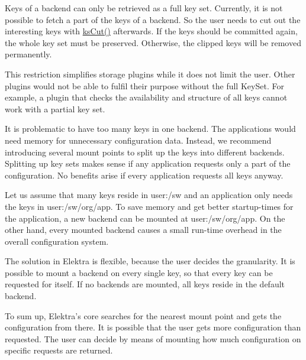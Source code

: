 \label{doc_help_elektra-granularity_md_md_doc_help_elektra_granularity}%
%
 Keys of a backend can only be retrieved as a full key set. Currently, it is not possible to fetch a part of the keys of a backend. So the user needs to cut out the interesting keys with {\ttfamily \mbox{\hyperlink{group__keyset_ga6b00cf82b59af4d883a9bad6cf4a4a4a}{ks\+Cut()}}} afterwards. If the keys should be committed again, the whole key set must be preserved. Otherwise, the clipped keys will be removed permanently.

This restriction simplifies storage plugins while it does not limit the user. Other plugins would not be able to fulfil their purpose without the full {\ttfamily Key\+Set}. For example, a plugin that checks the availability and structure of all keys cannot work with a partial key set.

It is problematic to have too many keys in one backend. The applications would need memory for unnecessary configuration data. Instead, we recommend introducing several mount points to split up the keys into different backends. Splitting up key sets makes sense if any application requests only a part of the configuration. No benefits arise if every application requests all keys anyway.

Let us assume that many keys reside in {\ttfamily user\+:/sw} and an application only needs the keys in {\ttfamily user\+:/sw/org/app}. To save memory and get better startup-\/times for the application, a new backend can be mounted at {\ttfamily user\+:/sw/org/app}. On the other hand, every mounted backend causes a small run-\/time overhead in the overall configuration system.

The solution in Elektra is flexible, because the user decides the granularity. It is possible to mount a backend on every single key, so that every key can be requested for itself. If no backends are mounted, all keys reside in the default backend.

To sum up, Elektra’s core searches for the nearest mount point and gets the configuration from there. It is possible that the user gets more configuration than requested. The user can decide by means of mounting how much configuration on specific requests are returned. 
